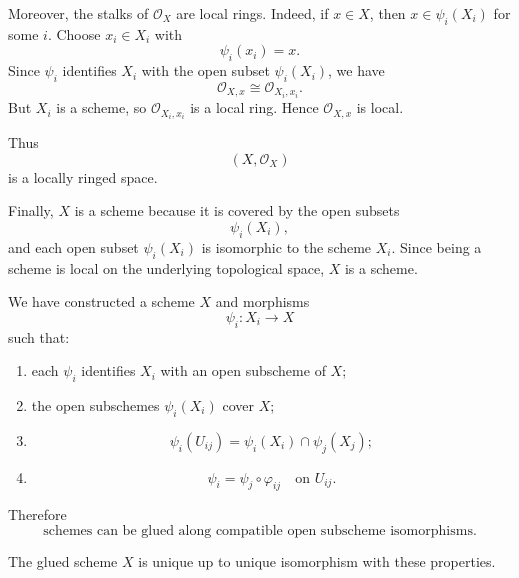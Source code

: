 Moreover, the stalks of \(\mathcal O_X\) are local rings. Indeed, if \(x\in X\), then \(x\in \psi_i(X_i)\) for some \(i\). Choose \(x_i\in X_i\) with
\[
\psi_i(x_i)=x.
\]
Since \(\psi_i\) identifies \(X_i\) with the open subset \(\psi_i(X_i)\), we have
\[
\mathcal O_{X,x}\cong \mathcal O_{X_i,x_i}.
\]
But \(X_i\) is a scheme, so \(\mathcal O_{X_i,x_i}\) is a local ring. Hence \(\mathcal O_{X,x}\) is local.

Thus
\[
(X,\mathcal O_X)
\]
is a locally ringed space.

Finally, \(X\) is a scheme because it is covered by the open subsets
\[
\psi_i(X_i),
\]
and each open subset \(\psi_i(X_i)\) is isomorphic to the scheme \(X_i\). Since being a scheme is local on the underlying topological space, \(X\) is a scheme.

We have constructed a scheme \(X\) and morphisms
\[
\psi_i:X_i\to X
\]
such that:

\begin{enumerate}[label=\textup{(\arabic*)}]
	\item each \(\psi_i\) identifies \(X_i\) with an open subscheme of \(X\);
	
	\item the open subschemes \(\psi_i(X_i)\) cover \(X\);
	
	\item
	\[
	\psi_i(U_{ij})
	=
	\psi_i(X_i)\cap \psi_j(X_j);
	\]
	
	\item
	\[
	\psi_i
	=
	\psi_j\circ \varphi_{ij}
	\quad\text{on }U_{ij}.
	\]
\end{enumerate}

Therefore
\[
\boxed{
	\text{schemes can be glued along compatible open subscheme isomorphisms.}
}
\]

The glued scheme \(X\) is unique up to unique isomorphism with these properties.
